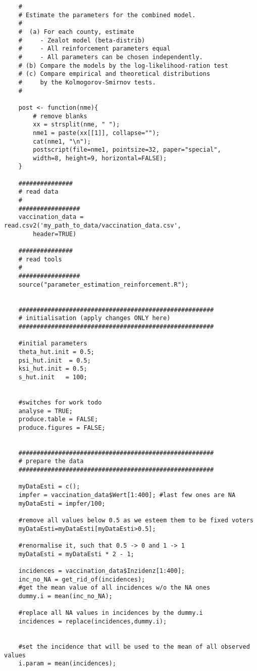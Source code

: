 	\begin{lstlisting}
	#
	# Estimate the parameters for the combined model.
	#
	#  (a) For each county, estimate
	#     - Zealot model (beta-distrib)
	#     - All reinforcement parameters equal
	#     - All parameters can be chosen independently.
	# (b) Compare the models by the log-likelihood-ration test
	# (c) Compare empirical and theoretical distributions 
	#     by the Kolmogorov-Smirnov tests.
	#
	
	post <- function(nme){
		# remove blanks
		xx = strsplit(nme, " ");
		nme1 = paste(xx[[1]], collapse="");
		cat(nme1, "\n");
		postscript(file=nme1, pointsize=32, paper="special",
		width=8, height=9, horizontal=FALSE);
	}
	
	###############
	# read data
	#
	#################
	vaccination_data = read.csv2('my_path_to_data/vaccination_data.csv', 
		header=TRUE)
	
	###############
	# read tools
	#
	#################
	source("parameter_estimation_reinforcement.R");
	
	
	######################################################
	# initialisation (apply changes ONLY here)
	######################################################
	
	#initial parameters
	theta_hut.init = 0.5;
	psi_hut.init  = 0.5;
	ksi_hut.init = 0.5;
	s_hut.init   = 100; 
	
	
	#switches for work todo
	analyse = TRUE;
	produce.table = FALSE;
	produce.figures = FALSE;
	
	
	######################################################
	# prepare the data
	######################################################
	
	myDataEsti = c();
	impfer = vaccination_data$Wert[1:400]; #last few ones are NA
	myDataEsti = impfer/100; 
	
	#remove all values below 0.5 as we esteem them to be fixed voters
	myDataEsti=myDataEsti[myDataEsti>0.5];
	
	#renormalise it, such that 0.5 -> 0 and 1 -> 1
	myDataEsti = myDataEsti * 2 - 1;
	
	incidences = vaccination_data$Inzidenz[1:400];
	inc_no_NA = get_rid_of(incidences);
	#get the mean value of all incidences w/o the NA ones
	dummy.i = mean(inc_no_NA);
	
	#replace all NA values in incidences by the dummy.i
	incidences = replace(incidences,dummy.i);
	
	
	#set the incidence that will be used to the mean of all observed values
	i.param = mean(incidences);
	

\end{lstlisting}

